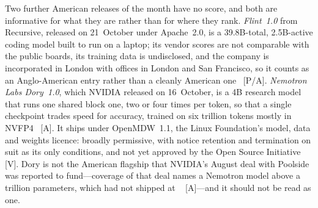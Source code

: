 Two further American releases of the month have no score, and both are informative for what they are rather than for where they rank. \emph{Flint~1.0} from Recursive, released on 21~October under Apache~2.0, is a 39.8B-total, 2.5B-active coding model built to run on a laptop; its vendor scores are not comparable with the public boards, its training data is undisclosed, and the company is incorporated in London with offices in London and San Francisco, so it counts as an Anglo-American entry rather than a cleanly American one~\cite{lit-flint} [P/A]. \emph{Nemotron Labs Dory~1.0}, which NVIDIA released on 16~October, is a 4B research model that runs one shared block one, two or four times per token, so that a single checkpoint trades speed for accuracy, trained on six trillion tokens mostly in NVFP4~\cite{lit-dory} [A]. It ships under OpenMDW~1.1, the Linux Foundation's model, data and weights licence: broadly permissive, with notice retention and termination on suit as its only conditions, and not yet approved by the Open Source Initiative~\cite{lit-openmdw} [V]. Dory is not the American flagship that NVIDIA's August deal with Poolside was reported to fund---coverage of that deal names a Nemotron model above a trillion parameters, which had not shipped at \datafreeze~\cite{nvda-poolside,nemotron4} [A]---and it should not be read as one.

